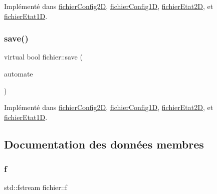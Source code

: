 Implémenté dans \mbox{\hyperlink{classfichier_config2_d_a90761ac1866815bd59b0f1730ce6bd5f}{fichier\+Config2D}}, \mbox{\hyperlink{classfichier_config1_d_a598c6ad0c9c16735b6c5843198dcc682}{fichier\+Config1D}}, \mbox{\hyperlink{classfichier_etat2_d_a1509a84b133ea169370a46301f74739e}{fichier\+Etat2D}}, et \mbox{\hyperlink{classfichier_etat1_d_a06c7ac08352e595eda7df415e50e66f8}{fichier\+Etat1D}}.

\mbox{\label{classfichier_ac54bfc9ea8c980c0b46bb291d3abdef4}} 
\subsubsection{\texorpdfstring{save()}{save()}}
{\footnotesize\ttfamily virtual bool fichier\+::save (\begin{DoxyParamCaption}\item[{const \mbox{\hyperlink{class_cellular_automata}{Cellular\+Automata}} \&}]{automate }\end{DoxyParamCaption})\hspace{0.3cm}{\ttfamily [pure virtual]}}



Implémenté dans \mbox{\hyperlink{classfichier_config2_d_ac91d6cd20fd9edc6ed71684b8d5a1b40}{fichier\+Config2D}}, \mbox{\hyperlink{classfichier_config1_d_a759fa0735b22b3f5cceeb0fb414fc056}{fichier\+Config1D}}, \mbox{\hyperlink{classfichier_etat2_d_a0acba6c601772898383006d2c705a177}{fichier\+Etat2D}}, et \mbox{\hyperlink{classfichier_etat1_d_a120ee4b6234a18bdb88c5d60bd0ef5c0}{fichier\+Etat1D}}.



\subsection{Documentation des données membres}
\mbox{\label{classfichier_ad4aa9acd482d376366be3d488e6af0ad}} 
\subsubsection{\texorpdfstring{f}{f}}
{\footnotesize\ttfamily std\+::fstream fichier\+::f\hspace{0.3cm}{\ttfamily [protected]}}

\mbox{\label{classfichier_a5507421c34a4358be0d0f842f74293fc}} 
